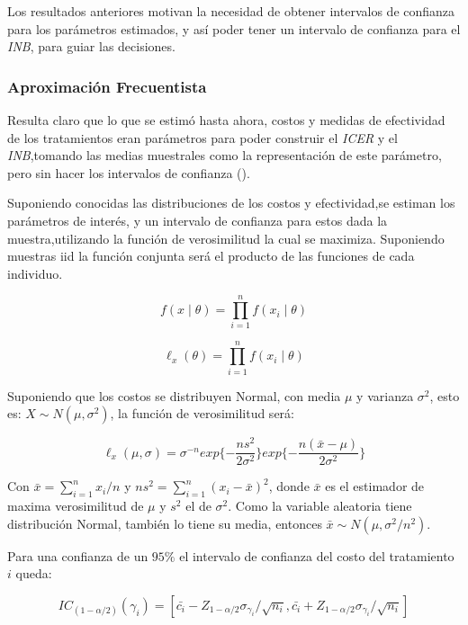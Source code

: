 \documentclass{siep}
\begin{document}
Los resultados anteriores motivan la necesidad de obtener intervalos de confianza para los parámetros estimados, y así poder tener un intervalo de confianza para el \textit{INB}, para guiar las decisiones.

\subsubsection{Aproximación Frecuentista}

\label{sec:AF}
Resulta claro que lo que se estim\'o hasta ahora, costos y medidas de efectividad de los tratamientos eran parámetros para poder construir el \textit{ICER} y el \textit{INB},tomando las medias muestrales como la representación de este parámetro, pero sin hacer los intervalos de confianza (\cite{moreno_bayesian_nodate}). 

Suponiendo conocidas las distribuciones de los costos y efectividad,se  estiman los parámetros de interés, y un intervalo de confianza para estos dada la muestra,utilizando la función de verosimilitud la  cual se maximiza. Suponiendo muestras iid la función conjunta será el producto de las funciones de cada individuo.

\begin{equation}
f(x\mid \theta) = \prod_{i=1}^n f(x_i\mid \theta)
\end{equation}


\begin{equation}
\ell_x(\theta) = \prod_{i=1}^n f(x_i\mid \theta)
\end{equation}


Suponiendo que los costos se distribuyen Normal, con media $\mu$ y varianza $\sigma^2$, esto es: $X \sim N(\mu,\sigma^2)$, la función de verosimilitud será:

\begin{equation}
\ell_x(\mu,\sigma)= \sigma^{-n}exp\{-\frac{ns^2}{2\sigma^2}\}exp\{-\frac{n(\bar{x}-\mu)}{2\sigma^2}\}
\end{equation}

Con $\bar{x} = \sum_{i=1}^n x_i/n$ y $ns^2=\sum_{i=1}^n (x_i-\bar{x})^2$, donde $\bar{x}$ es el estimador de maxima verosimilitud de $\mu$ y $s^2$ el de $\sigma^2$.
Como la variable aleatoria tiene distribución Normal, también lo tiene su media, entonces $\bar{x} \sim N(\mu,\sigma^2/n^2)$. 

Para una confianza de un $95\%$  el intervalo de confianza del costo del tratamiento $i$ queda:

\begin{equation}
IC_{(1-\alpha/2)}(\gamma_i) = [\bar{c_i} - Z_{1-\alpha/2}\sigma_{\gamma_i}/\sqrt{n_i} , \bar{c_i} + Z_{1-\alpha/2}\sigma_{\gamma_i}/\sqrt{n_i}  ]
\end{equation}
\end{document}
